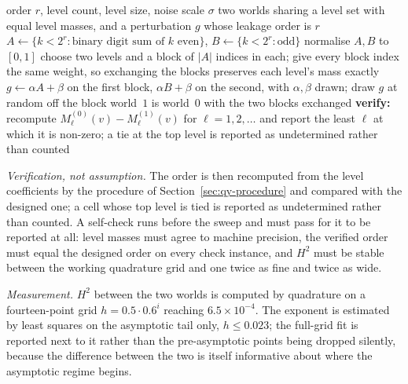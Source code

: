 \documentclass[conference]{IEEEtran}
\theoremstyle{definition}
\begin{document}
\begin{algorithm}[htbp]
\caption{An instance with a designed leakage order $r$}
\label{alg:qy-instance}
\begin{algorithmic}[1]
\REQUIRE order $r$, level count, level size, noise scale $\sigma$
\ENSURE two worlds sharing a level set with equal level masses, and a perturbation $g$ whose
        leakage order is $r$
\STATE $A\leftarrow\{k<2^{r}:\text{binary digit sum of }k\text{ even}\}$,
       $B\leftarrow\{k<2^{r}:\text{odd}\}$
\STATE normalise $A,B$ to $[0,1]$ 
\STATE choose two levels and a block of $|A|$ indices in each; give every block index the
       same weight, so exchanging the blocks preserves each level's mass exactly
\STATE $g\leftarrow\alpha A+\beta$ on the first block, $\alpha B+\beta$ on the second, with
       $\alpha,\beta$ drawn; draw $g$ at random off the block
\STATE world~$1$ is world~$0$ with the two blocks exchanged
\STATE \textbf{verify:} recompute $M^{(0)}_{\ell}(v)-M^{(1)}_{\ell}(v)$ for
       $\ell=1,2,\dots$ and report the least $\ell$ at which it is non-zero; a tie at the top
       level is reported as undetermined rather than counted
\end{algorithmic}
\end{algorithm}

\emph{Verification, not assumption.} The order is then recomputed from the level coefficients
by the procedure of Section~\ref{sec:qy-procedure} and compared with the designed one; a cell
whose top level is tied is reported as undetermined rather than counted. A self-check runs
before the sweep and must pass for it to be reported at all: level masses must agree to
machine precision, the verified order must equal the designed order on every check instance,
and $H^{2}$ must be stable between the working quadrature grid and one twice as fine and
twice as wide.

\emph{Measurement.} $H^{2}$ between the two worlds is computed by quadrature on a
fourteen-point grid $h=0.5\cdot0.6^{i}$ reaching $6.5\times10^{-4}$. The exponent is
estimated by least squares on the asymptotic tail only, $h\le0.023$; the full-grid fit is
reported next to it rather than the pre-asymptotic points being dropped silently, because the
difference between the two is itself informative about where the asymptotic regime begins.
\end{document}
